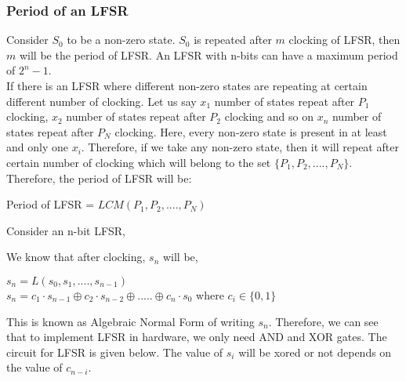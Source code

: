 \documentclass[11pt]{article}
\begin{document}
\subsubsection*{Period of an LFSR} 
Consider $S_0$ to be a non-zero state. $S_0$ is repeated after $m$ clocking of LFSR, then $m$ will be the period of LFSR. An LFSR with n-bits can have a maximum period of $2^n - 1$.\\


If there is an LFSR where different non-zero states are repeating at certain different number of clocking. Let us say $x_1$ number of states repeat after $P_1$ clocking, $x_2$ number of states repeat after $P_2$ clocking and so on $x_n$ number of states repeat after $P_N$ clocking. Here, every non-zero state is present in at least and only one $x_i$. Therefore, if we take any non-zero state, then it will repeat after certain number of clocking which will belong to the set $\{P_1, P_2,...., P_N\}$. Therefore, the period of LFSR will be:
\begin{center}
    Period of LFSR = $LCM(P_1, P_2,...., P_N)$
\end{center}
Consider an n-bit LFSR,
\begin{center}
\end{center}
We know that after clocking, $s_n$ will be,
\begin{center}
    $s_n = L(s_0,s_1,...., s_{n-1})$\\
    $s_n = c_1\cdot s_{n-1} \oplus c_2 \cdot s_{n-2} \oplus ..... \oplus c_n \cdot s_0$ where $c_i \in \{0, 1\}$
\end{center}
This is known as Algebraic Normal Form of writing $s_n$. Therefore, we can see that to implement LFSR in hardware, we only need AND and XOR gates. The circuit for LFSR is given below. The value of $s_i$ will be xored or not depends on the value of $c_{n-i}$.
\end{document}

